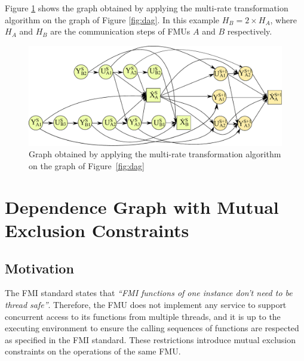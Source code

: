 Figure \ref{fig:dagmr} shows the graph obtained by applying the multi-rate transformation algorithm on the graph of Figure \ref{fig:dag}. In this example $H_B = 2 \times H_A$, where $H_A$ and $H_B$ are the communication steps of FMUs $A$ and $B$ respectively.

\begin{figure}[htb]
\centering
  \includegraphics[scale=0.5]{figures/Operation_Graph_Two_Models_Multirate}
\caption{Graph obtained by applying the multi-rate transformation algorithm on the graph of Figure~\ref{fig:dag}}
\label{fig:dagmr}
\end{figure}

\section{Dependence Graph with Mutual Exclusion Constraints}

\subsection{Motivation}

The FMI standard states that \textit{``FMI functions of one instance don't need to be thread safe''}. Therefore, the FMU does not implement any service to support concurrent access to its functions from multiple threads, and it is up to the executing environment to ensure the calling sequences of functions are respected as specified in the FMI standard. These restrictions introduce mutual exclusion constraints on the operations of the same FMU.

